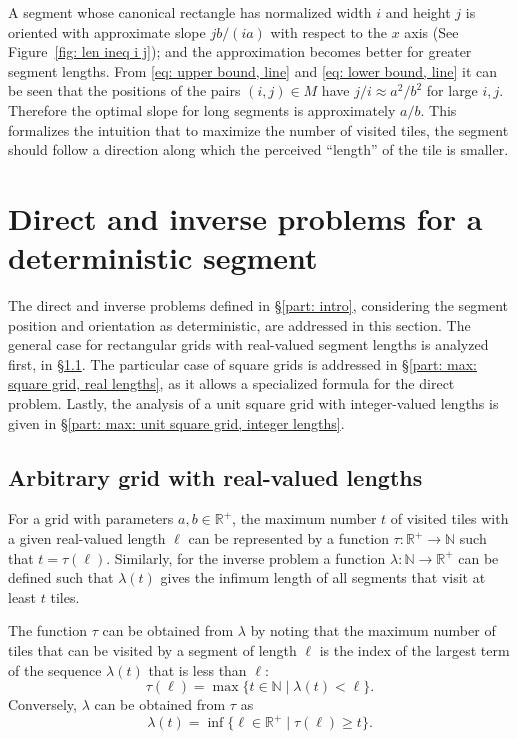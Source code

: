 \documentclass[12pt, a4paper]{article}
\newcommand{\st}{\mid}%
\newcommand{\funt}{\tau} %
\newcommand{\funl}{\lambda} %
\newcommand{\len}{\ell} %
\newcommand{\tiles}{t} %
\newcommand{\mss}{M}
\newcommand{\touch}{visit}
\newcommand{\touched}{visited}
\begin{document}
A segment whose canonical rectangle has normalized width $i$ and height $j$ is oriented with approximate slope $jb/(ia)$ with respect to the $x$ axis (See Figure~\ref{fig: len ineq i j}); and the approximation becomes better for greater segment lengths. From \eqref{eq: upper bound, line} and \eqref{eq: lower bound, line} it can be seen that the positions of the pairs $(i,j) \in \mss$ have $j/i \approx a^2/b^2$ for large $i, j$. Therefore the optimal slope for long segments is approximately $a/b$. This formalizes the intuition that to maximize the number of \touched{} tiles, the segment should follow a direction along which the perceived ``length'' of the tile is smaller.


\section{Direct and inverse problems for a deterministic segment}
\label{part: max}

The direct and inverse problems defined in \S\ref{part: intro}, considering the segment position and orientation as deterministic, are addressed in this section. The general case for rectangular grids with real-valued segment lengths is analyzed first, in \S\ref{part: max: arbitrary grid, real lengths}. The particular case of square grids is addressed in \S\ref{part: max: square grid, real lengths}, as it allows a specialized formula for the direct problem. Lastly, the analysis of a unit square grid with integer-valued lengths is given in \S\ref{part: max: unit square grid, integer lengths}.


\subsection{Arbitrary grid with real-valued lengths}
\label{part: max: arbitrary grid, real lengths}

For a grid with parameters $a, b \in \mathbb R^+$, the maximum number $\tiles$ of \touched{} tiles with a given real-valued length $\len$ can be represented by a function $\funt: \mathbb R^+ \to \mathbb N$ such that $\tiles = \funt(\len)$. Similarly, for the inverse problem a function $\funl: \mathbb N \to \mathbb R^+$ can be defined such that $\funl(\tiles)$ gives the infimum length of all segments that \touch{} at least $\tiles$ tiles.

The function $\funt$ can be obtained from $\funl$ by noting that the maximum number of tiles that can be \touched{} by a segment of length $\len$ is the index of the largest term of the sequence $\funl(\tiles)$ that is less than $\len$:
\begin{equation}
\label{eq: funt funl}
\funt(\len) = \max \{\tiles \in \mathbb N \st \funl(\tiles)<\len\}.
\end{equation}
Conversely, $\funl$ can be obtained from $\funt$ as
\begin{equation}
\label{eq: funl funt}
\funl(\tiles) = \inf\{\len \in \mathbb R^+ \st \funt(\len) \geq \tiles\}.
\end{equation}
\end{document}
